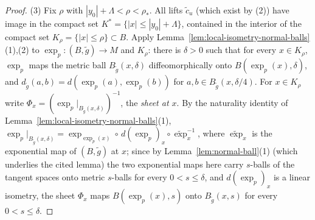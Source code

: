\begin{proof}
(3) Fix $\rho$ with $|y_0|+\Lambda<\rho<\rho_*$. All lifts
$\tilde c_u$ (which exist by (2)) have image in the compact set
$K^*=\{|x|\le|y_0|+\Lambda\}$, contained in the interior of the
compact set $K_\rho=\{|x|\le\rho\}\subset B$. Apply
Lemma~\ref{lem:local-isometry-normal-balls}(1),(2) to
$\exp_p\colon(B,\tilde g)\to M$ and $K_\rho$: there is
$\delta>0$ such that for every $x\in K_\rho$, $\exp_p$ maps the
metric ball $B_{\tilde g}(x,\delta)$ diffeomorphically onto
$B(\exp_p(x),\delta)$, and
$d_{\tilde g}(a,b)=d\left(\exp_p(a),\exp_p(b)\right)$ for
$a,b\in B_{\tilde g}(x,\delta/4)$. For $x\in K_\rho$ write
$\Phi_x=\left(\exp_p|_{B_{\tilde g}(x,\delta)}\right)^{-1}$, the
\emph{sheet at $x$}. By the naturality identity of
Lemma~\ref{lem:local-isometry-normal-balls}(1),
$\exp_p|_{B_{\tilde g}(x,\delta)}
=\exp_{\exp_p(x)}\circ\,d(\exp_p)_x\circ\widetilde\exp_x^{-1}$,
where $\widetilde\exp_x$ is the exponential map of $(B,\tilde g)$
at $x$; since by Lemma~\ref{lem:normal-ball}(1) (which underlies
the cited lemma) the two exponential maps here carry $s$-balls of
the tangent spaces onto metric $s$-balls for every $0<s\le\delta$,
and $d(\exp_p)_x$ is a linear isometry, the sheet $\Phi_x$ maps
$B(\exp_p(x),s)$ onto $B_{\tilde g}(x,s)$ for every
$0<s\le\delta$.


\end{proof}
